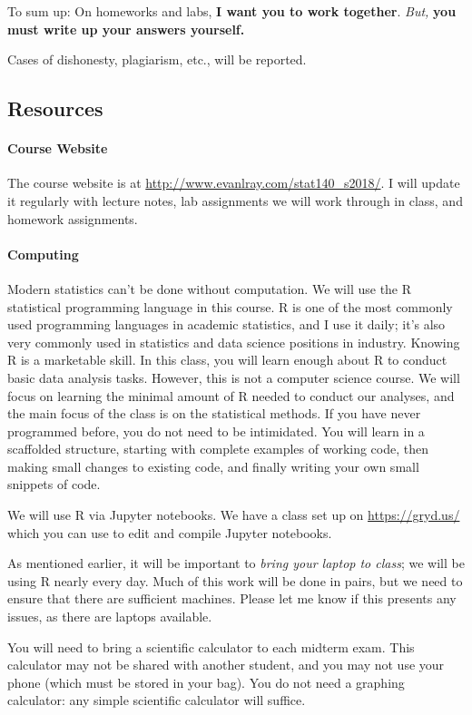 \documentclass[11pt]{article}
\begin{document}
To sum up: On homeworks and labs, \textbf{I want you to work together}.  \emph{But,} \textbf{you must write up your answers yourself.}

Cases of dishonesty, plagiarism, etc., will be reported.

\subsection*{Resources}

\paragraph{Course Website}
The course website is at \url{http://www.evanlray.com/stat140_s2018/}.  I will update it regularly with lecture notes, lab assignments we will work through in class, and homework assignments.

\paragraph{Computing}
Modern statistics can't be done without computation.  We will use the R statistical programming language in this course.  R is one of the most commonly used programming languages in academic statistics, and I use it daily; it's also very commonly used in statistics and data science positions in industry.  Knowing R is a marketable skill.  In this class, you will learn enough about R to conduct basic data analysis tasks.  However, this is not a computer science course.  We will focus on learning the minimal amount of R needed to conduct our analyses, and the main focus of the class is on the statistical methods.  If you have never programmed before, you do not need to be intimidated.  You will learn in a scaffolded structure, starting with complete examples of working code, then making small changes to existing code, and finally writing your own small snippets of code.

We will use R via Jupyter notebooks.  We have a class set up on \url{https://gryd.us/} which you can use to edit and compile Jupyter notebooks.

As mentioned earlier, it will be important to \emph{bring your laptop to class}; we will be using R nearly every day.  Much of this work will be done in pairs, but we need to ensure that there are sufficient machines.  Please let me know if this presents any issues, as there are laptops available.

You will need to bring a scientific calculator to each midterm exam.  This calculator may not be shared with another student, and you may not use your phone (which must be stored in your bag).  You do not need a graphing calculator: any simple scientific calculator will suffice.
\end{document}
